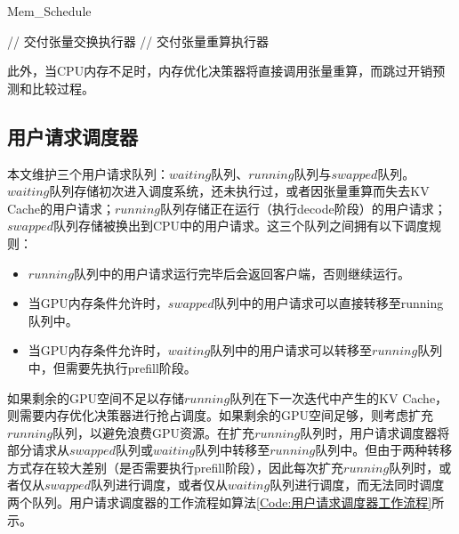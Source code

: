 \begin{algorithm}
  \caption{Mem\_Schedule}
  \label{Code:内存优化决策器工作流程}
  \small
  \begin{spacing}{1.2}
    \begin{algorithmic}[1]
           \hfill {// 交付张量交换执行器}
        \ELSE
           \hfill {// 交付张量重算执行器}
        \ENDIF
      \ENDWHILE
    \end{algorithmic}
  \end{spacing}
\end{algorithm}

此外，当CPU内存不足时，内存优化决策器将直接调用张量重算，而跳过开销预测和比较过程。

\subsection{用户请求调度器}

本文维护三个用户请求队列：$waiting$队列、$running$队列与$swapped$队列。$waiting$队列存储初次进入调度系统，还未执行过，或者因张量重算而失去KV Cache的用户请求；$running$队列存储正在运行（执行decode阶段）的用户请求；$swapped$队列存储被换出到CPU中的用户请求。这三个队列之间拥有以下调度规则：

\begin{itemize}
  \item $running$队列中的用户请求运行完毕后会返回客户端，否则继续运行。
  \item 当GPU内存条件允许时，$swapped$队列中的用户请求可以直接转移至running队列中。
  \item 当GPU内存条件允许时，$waiting$队列中的用户请求可以转移至$running$队列中，但需要先执行prefill阶段。
\end{itemize}

如果剩余的GPU空间不足以存储$running$队列在下一次迭代中产生的KV Cache，则需要内存优化决策器进行抢占调度。如果剩余的GPU空间足够，则考虑扩充$running$队列，以避免浪费GPU资源。在扩充$running$队列时，用户请求调度器将部分请求从$swapped$队列或$waiting$队列中转移至$running$队列中。但由于两种转移方式存在较大差别（是否需要执行prefill阶段），因此每次扩充$running$队列时，或者仅从$swapped$队列进行调度，或者仅从$waiting$队列进行调度，而无法同时调度两个队列。用户请求调度器的工作流程如算法\ref{Code:用户请求调度器工作流程}所示。

